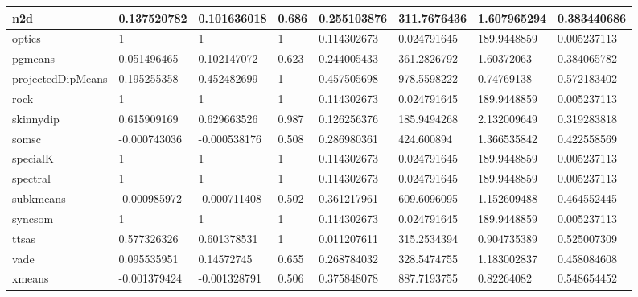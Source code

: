\begin{table}[H]
\begin{tabular}{|l|l|l|l|l|l|l|l|}
\hline
n2d & 0.137520782 & 0.101636018 & 0.686 & 0.255103876 & 311.7676436 & 1.607965294 & 0.383440686 \\
\hline
optics & 1 & 1 & 1 & 0.114302673 & 0.024791645 & 189.9448859 & 0.005237113 \\
\hline
pgmeans & 0.051496465 & 0.102147072 & 0.623 & 0.244005433 & 361.2826792 & 1.60372063 & 0.384065782 \\
\hline
projectedDipMeans & 0.195255358 & 0.452482699 & 1 & 0.457505698 & 978.5598222 & 0.74769138 & 0.572183402 \\
\hline
rock & 1 & 1 & 1 & 0.114302673 & 0.024791645 & 189.9448859 & 0.005237113 \\
\hline
skinnydip & 0.615909169 & 0.629663526 & 0.987 & 0.126256376 & 185.9494268 & 2.132009649 & 0.319283818 \\
\hline
somsc & -0.000743036 & -0.000538176 & 0.508 & 0.286980361 & 424.600894 & 1.366535842 & 0.422558569 \\
\hline
specialK & 1 & 1 & 1 & 0.114302673 & 0.024791645 & 189.9448859 & 0.005237113 \\
\hline
spectral & 1 & 1 & 1 & 0.114302673 & 0.024791645 & 189.9448859 & 0.005237113 \\
\hline
subkmeans & -0.000985972 & -0.000711408 & 0.502 & 0.361217961 & 609.6096095 & 1.152609488 & 0.464552445 \\
\hline
syncsom & 1 & 1 & 1 & 0.114302673 & 0.024791645 & 189.9448859 & 0.005237113 \\
\hline
ttsas & 0.577326326 & 0.601378531 & 1 & 0.011207611 & 315.2534394 & 0.904735389 & 0.525007309 \\
\hline
vade & 0.095535951 & 0.14572745 & 0.655 & 0.268784032 & 328.5474755 & 1.183002837 & 0.458084608 \\
\hline
xmeans & -0.001379424 & -0.001328791 & 0.506 & 0.375848078 & 887.7193755 & 0.82264082 & 0.548654452 \\
\hline
\end{tabular}
\end{table}